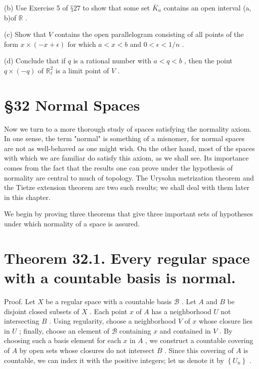 (b) Use Exercise 5 of \(§{27}\) to show that some set \({\bar{K}}_{n}\) contains an open interval (a, b)of \(\mathbb{R}\) .

(c) Show that \(V\) contains the open parallelogram consisting of all points of the form \(x \times  \left( {-x + \epsilon }\right)\) for which \(a < x < b\) and \(0 < \epsilon  < 1/n\) .

(d) Conclude that if \(q\) is a rational number with \(a < q < b\) , then the point \(q \times  \left( {-q}\right)\) of \({\mathbb{R}}_{\ell }^{2}\) is a limit point of \(V\) .

\section*{§32 Normal Spaces}

Now we turn to a more thorough study of spaces satisfying the normality axiom. In one sense, the term "normal" is something of a misnomer, for normal spaces are not as well-behaved as one might wish. On the other hand, most of the spaces with which we are familiar do satisfy this axiom, as we shall see. Its importance comes from the fact that the results one can prove under the hypothesis of normality are central to much of topology. The Urysohn metrization theorem and the Tietze extension theorem are two such results; we shall deal with them later in this chapter.

We begin by proving three theorems that give three important sets of hypotheses under which normality of a space is assured.

\section*{Theorem 32.1. Every regular space with a countable basis is normal.}

Proof. Let \(X\) be a regular space with a countable basis \(\mathcal{B}\) . Let \(A\) and \(B\) be disjoint closed subsets of \(X\) . Each point \(x\) of \(A\) has a neighborhood \(U\) not intersecting \(B\) . Using regularity, choose a neighborhood \(V\) of \(x\) whose closure lies in \(U\) ; finally, choose an element of \(\mathcal{B}\) containing \(x\) and contained in \(V\) . By choosing such a basis element for each \(x\) in \(A\) , we construct a countable covering of \(A\) by open sets whose closures do not intersect \(B\) . Since this covering of \(A\) is countable, we can index it with the positive integers; let us denote it by \(\left\{  {U}_{n}\right\}\) .

